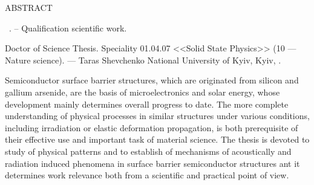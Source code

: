 \noindent
ABSTRACT						
					
\vspace{0.7cm}
\noindent
\thesisAuthorFIOen~\thesisTitleEn. --  Qualification scientific work.

\vspace{0.7cm}
\noindent
Doctor of Science Thesis. Speciality 01.04.07 <<Solid State Physics>> (10 --- Nature science).  --- Taras
Shevchenko National University of Kyiv, Kyiv, \thesisYear.


\vspace{0.7cm}
Semiconductor surface barrier structures, which are originated from silicon and gallium arsenide, are the basis of microelectronics and solar energy, whose development mainly determines overall progress to date.
The more complete understanding of physical processes in similar structures under various conditions, including irradiation or elastic deformation propagation, is both prerequisite of their effective use and important task of material science.
The thesis is devoted to study of physical patterns and to establish of mechanisms of acoustically  and radiation induced phenomena in surface barrier semiconductor structures ant it determines work relevance both from a scientific and practical point of view.

